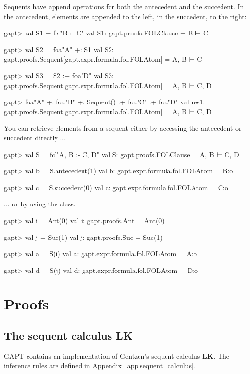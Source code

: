 \documentclass[a4paper,11pt]{book}
\newcommand{\LK}{\textbf{LK}}
\newcommand{\cli}[1]{{\ttfamily {#1}}}
\begin{document}
Sequents have append operations for both the antecedent and the succedent. In the antecedent,
elements are appended to the left, in the succedent, to the right:

\begin{clilisting}
gapt> val S1 = fcl"B :- C"
val S1: gapt.proofs.FOLClause = B ⊢ C

gapt> val S2 = foa"A" +: S1
val S2: gapt.proofs.Sequent[gapt.expr.formula.fol.FOLAtom] = A, B ⊢ C

gapt> val S3 = S2 :+ foa"D"
val S3: gapt.proofs.Sequent[gapt.expr.formula.fol.FOLAtom] = A, B ⊢ C, D

gapt> foa"A" +: foa"B" +: Sequent() :+ foa"C" :+ foa"D"
val res1: gapt.proofs.Sequent[gapt.expr.formula.fol.FOLAtom] = A, B ⊢ C, D

\end{clilisting}

You can retrieve elements from a sequent either by accessing the antecedent
or succedent directly ...
\begin{clilisting}
gapt> val S = fcl"A, B :- C, D"
val S: gapt.proofs.FOLClause = A, B ⊢ C, D

gapt> val b = S.antecedent(1)
val b: gapt.expr.formula.fol.FOLAtom = B:o

gapt> val c = S.succedent(0)
val c: gapt.expr.formula.fol.FOLAtom = C:o

\end{clilisting}
... or by using the \cli{SequentIndex} class:

\begin{clilisting}
gapt> val i = Ant(0)
val i: gapt.proofs.Ant = Ant(0)

gapt> val j = Suc(1)
val j: gapt.proofs.Suc = Suc(1)

gapt> val a = S(i)
val a: gapt.expr.formula.fol.FOLAtom = A:o

gapt> val d = S(j)
val d: gapt.expr.formula.fol.FOLAtom = D:o

\end{clilisting}


\section{Proofs}\label{sec:entering_proofs}

\subsection{The sequent calculus LK}
GAPT contains an implementation of Gentzen's sequent calculus {\LK}.
The inference rules are defined in Appendix~\ref{app:sequent_calculus}.
\end{document}
